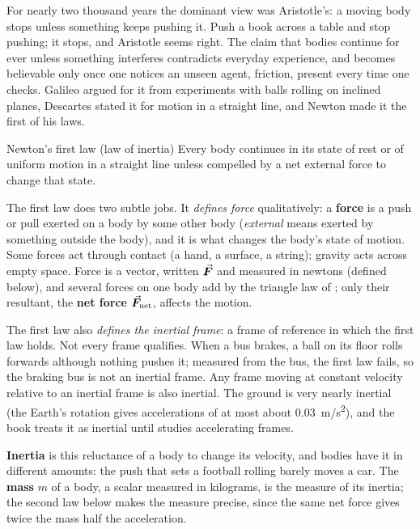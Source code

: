For nearly two thousand years the dominant view was Aristotle's: a moving body stops unless something
keeps pushing it. Push a book across a table and stop pushing; it stops, and Aristotle seems right. The
claim that bodies continue for ever unless something interferes contradicts everyday experience, and
becomes believable only once one notices an unseen agent, friction, present every time one checks. Galileo argued for it from experiments with balls rolling on inclined
planes, Descartes stated it for motion in a straight line, and Newton made it the first of his laws.

\begin{keybox}{Newton's first law (law of inertia)}
Every body continues in its state of rest or of uniform motion in a straight line unless compelled by a
net external force to change that state.
\end{keybox}

The first law does two subtle jobs. It \emph{defines force} qualitatively: a \textbf{force} is a push
or pull exerted on a body by some other body (\emph{external} means exerted by something outside the
body), and it is what changes the body's state of motion. Some forces act through contact (a hand, a
surface, a string); gravity acts across empty space. Force is a vector, written $\vec{\bm{F}}$ and measured in
newtons (defined below), and several forces on one body add by the triangle law of ;
only their resultant, the \textbf{net force} $\vec{\bm{F}}_{\text{net}}$, affects the motion.

The first law also \emph{defines the inertial frame}: a frame of reference in which the first law holds.
Not every frame qualifies. When a bus brakes, a ball on its floor rolls forwards although nothing pushes
it; measured from the bus, the first law fails, so the braking bus is not an inertial frame. Any frame
moving at constant velocity relative to an inertial frame is also inertial. The ground is very nearly
inertial (the Earth's rotation gives accelerations of at most about \SI{0.03}{m/s^2}), and the book
treats it as inertial until  studies accelerating frames.

\textbf{Inertia} is this reluctance of a body to change its velocity, and bodies have it in different
amounts: the push that sets a football rolling barely moves a car. The \textbf{mass} $m$ of a body, a
scalar measured in kilograms, is the measure of its inertia; the second law below makes the measure
precise, since the same net force gives twice the mass half the acceleration.

